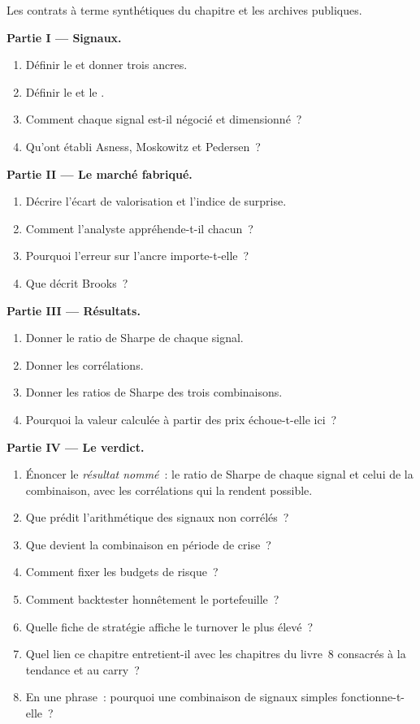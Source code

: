 \begin{problem}\label{pb:s2:systematic-macro:1}
Les contrats à terme synthétiques du chapitre et les archives publiques.

\medskip\noindent\textbf{Partie I --- Signaux.}
\begin{enumerate}
\item Définir le  et donner trois ancres.
\item Définir le  et le .
\item Comment chaque signal est-il négocié et dimensionné~?
\item Qu'ont établi Asness, Moskowitz et Pedersen~?
\end{enumerate}

\medskip\noindent\textbf{Partie II --- Le marché fabriqué.}
\begin{enumerate}[resume]
\item Décrire l'écart de valorisation et l'indice de surprise.
\item Comment l'analyste appréhende-t-il chacun~?
\item Pourquoi l'erreur sur l'ancre importe-t-elle~?
\item Que décrit Brooks~?
\end{enumerate}

\medskip\noindent\textbf{Partie III --- Résultats.}
\begin{enumerate}[resume]
\item Donner le ratio de Sharpe de chaque signal.
\item Donner les corrélations.
\item Donner les ratios de Sharpe des trois combinaisons.
\item Pourquoi la valeur calculée à partir des prix échoue-t-elle ici~?
\end{enumerate}

\medskip\noindent\textbf{Partie IV --- Le verdict.}
\begin{enumerate}[resume]
\item Énoncer le \emph{résultat nommé}~: le ratio de Sharpe de chaque signal et celui de la combinaison, avec les corrélations qui la rendent possible.
\item Que prédit l'arithmétique des signaux non corrélés~?
\item Que devient la combinaison en période de crise~?
\item Comment fixer les budgets de risque~?
\item Comment backtester honnêtement le portefeuille~?
\item Quelle fiche de stratégie affiche le turnover le plus élevé~?
\item Quel lien ce chapitre entretient-il avec les chapitres du livre~8 consacrés à la tendance et au carry~?
\item En une phrase~: pourquoi une combinaison de signaux simples fonctionne-t-elle~?
\end{enumerate}
\end{problem}

